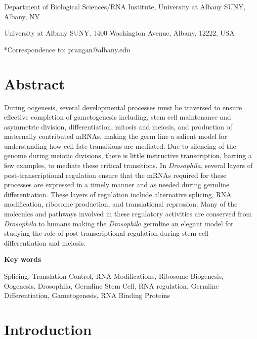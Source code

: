\documentclass[12pt,oneside]{reedthesis}
\begin{document}
Department of Biological Sciences/RNA Institute, University at Albany
SUNY, Albany, NY

University at Albany SUNY, 1400 Washington Avenue, Albany, 12222, USA

*Correspondence to: prangan@albany.edu

\hypertarget{abstract}{%
\section{Abstract}\label{abstract}}

During oogenesis, several developmental processes must be traversed to
ensure effective completion of gametogenesis including, stem cell
maintenance and asymmetric division, differentiation, mitosis and
meiosis, and production of maternally contributed mRNAs, making the germ
line a salient model for understanding how cell fate transitions are
mediated. Due to silencing of the genome during meiotic divisions, there
is little instructive transcription, barring a few examples, to mediate
these critical transitions. In \emph{Drosophila}, several layers of
post-transcriptional regulation ensure that the mRNAs required for these
processes are expressed in a timely manner and as needed during germline
differentiation. These layers of regulation include alternative
splicing, RNA modification, ribosome production, and translational
repression. Many of the molecules and pathways involved in these
regulatory activities are conserved from \emph{Drosophila} to humans making
the \emph{Drosophila} germline an elegant model for studying the role of
post-transcriptional regulation during stem cell differentiation and
meiosis.

\textbf{Key words}

{Splicing, Translation Control, RNA Modifications, Ribosome Biogenesis,
Oogenesis, Drosophila, Germline Stem Cell, RNA regulation, Germline
Differentiation, Gametogenesis, RNA Binding Proteins}

\hypertarget{introduction-1}{%
\section{Introduction}\label{introduction-1}}
\end{document}
